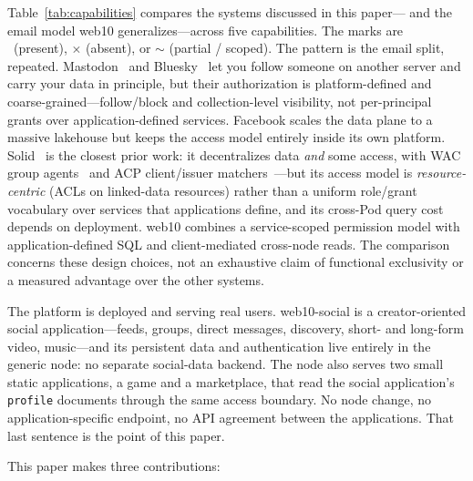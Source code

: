 \documentclass[sigconf, nonacm]{acmart}
\begin{document}
Table~\ref{tab:capabilities} compares the systems discussed in this paper---
and the email model web10 generalizes---across five capabilities. The marks
are \checkmark\ (present), $\times$ (absent), or $\sim$ (partial / scoped).
The pattern is the email split, repeated. Mastodon~\cite{activitypub2018} and
Bluesky~\cite{kleppmann2024} let you follow someone on another server and
carry your data in principle, but their authorization is platform-defined and
coarse-grained---follow/block and collection-level visibility, not
per-principal grants over application-defined services. Facebook scales the
data plane to a massive lakehouse but keeps the access model entirely inside
its own platform. Solid~\cite{solid2016} is the closest prior work: it
decentralizes data \emph{and} some access, with WAC group
agents~\cite{wac2022} and ACP client/issuer matchers~\cite{acp2022}---but
its access model is \emph{resource-centric} (ACLs on linked-data resources)
rather than a uniform role/grant vocabulary over services that applications
define, and its cross-Pod query cost depends on deployment. web10 combines a
service-scoped permission model with application-defined SQL and
client-mediated cross-node reads. The comparison concerns these design
choices, not an exhaustive claim of functional exclusivity or a measured
advantage over the other systems.

The platform is deployed and serving real users. web10-social is a
creator-oriented social application---feeds, groups, direct messages,
discovery, short- and long-form video, music---and its persistent data and
authentication live entirely in the generic node: no separate social-data
backend. The node also serves two small static applications, a game and a
marketplace, that read the social application's \texttt{profile} documents
through the same access boundary. No node change, no application-specific
endpoint, no API agreement between the applications. That last sentence is
the point of this paper.

This paper makes three contributions:
\end{document}
